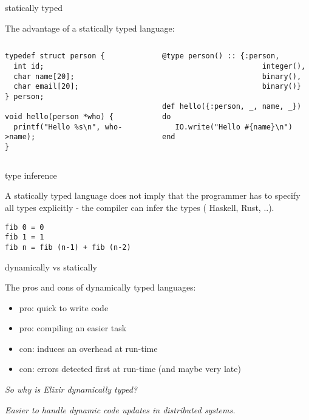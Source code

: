 \begin{frame}[fragile]{statically typed}

  The advantage of a statically typed language:
  \begin{columns}
    \begin{column}{0.5\textwidth}
\begin{verbatim}
typedef struct person {
  int id;
  char name[20];
  char email[20];
} person;

void hello(person *who) {
  printf("Hello %s\n", who->name);
}
\end{verbatim}
    \end{column}
    \begin{column}{0.5\textwidth}
\begin{verbatim}
@type person() :: {:person, 
                       integer(), 
                       binary(), 
                       binary()}
      
def hello({:person, _, name, _}) do
   IO.write("Hello #{name}\n")
end
\end{verbatim}
    \end{column}
  \end{columns}

  \vspace{20pt}
    
\end{frame}

\begin{frame}[fragile]{type inference}

  A statically typed language does not imply that the programmer has
  to specify all types explicitly - the compiler can infer the types (
  Haskell, Rust, ..).

  \vspace{10pt}\pause
\begin{verbatim}
fib 0 = 0
fib 1 = 1
fib n = fib (n-1) + fib (n-2)
\end{verbatim}
  

\end{frame}

\begin{frame}{dynamically vs statically}

The pros and cons of dynamically typed languages:

\begin{itemize}
\item pro: quick to write code
\item pro: compiling an easier task
\item con: induces an overhead at run-time
\item con: errors detected first at run-time (and maybe very late)
\end{itemize}

\pause
{\em So why is Elixir dynamically typed?}

\pause
{\em Easier to handle dynamic code updates in distributed systems.}

\end{frame}

